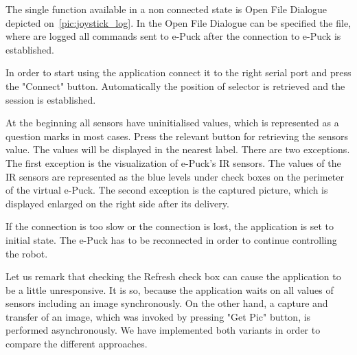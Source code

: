   The single function available in a non connected state
  is Open File Dialogue depicted on~\ref{pic:joystick_log}.
  In the  Open File Dialogue can be specified the file, 
  where are logged all commands sent to e-Puck after the connection
  to e-Puck is established.

  In order to start using the application connect it to the right serial port and press the "Connect" button.
  Automatically the position of selector is retrieved and the session is established.

  At the beginning all sensors have uninitialised values, 
  which is represented as a question marks in most cases.
  Press the relevant button for retrieving the sensors value. 
  The values will be displayed in the nearest label.
  There are two exceptions. The first exception is the visualization of e-Puck's IR sensors. 
  The values of the IR sensors
  are represented as the blue levels under check boxes on 
  the perimeter of the virtual e-Puck.
  The second  exception is the captured picture, which is displayed enlarged on the right side after its delivery.

  If the connection is too slow or the connection is lost, the application
  is set to initial state. The e-Puck has to be reconnected 
  in order to continue controlling the robot.

  Let us remark that checking the Refresh check box can 
  cause the application to be a little unresponsive.	
  It is so, because the application waits on all values of sensors including an image synchronously.
  On the other hand, a capture and transfer of an image, 
  which was invoked by pressing "Get Pic" button, is performed asynchronously. 
  We have implemented both variants in order to compare the different approaches.

